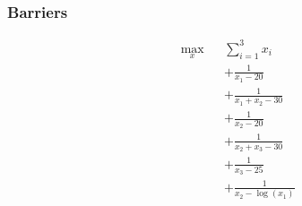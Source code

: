 \documentclass[paper=a4, fontsize=11pt]{scrartcl} %
\numberwithin{equation}{section} %
\numberwithin{figure}{section} %
\numberwithin{table}{section} %
\begin{document}

\subsubsection{Barriers}

\begin{equation}
	\begin{aligned}
		& \underset{x}{\text{max}}
		& & \sum_{i=1}^{3} x_i \\
		& & & + \frac{1}{x_1 - 20} \\
		& & & + \frac{1}{x_1 + x_2 - 30} \\
		& & & + \frac{1}{x_2 - 20} \\
		& & & + \frac{1}{x_2 + x_3 - 30} \\
		& & & + \frac{1}{x_3 - 25} \\
		& & & + \frac{1}{x_2 - \log(x_1)} \\
	\end{aligned}					
\end{equation}

\end{document}
